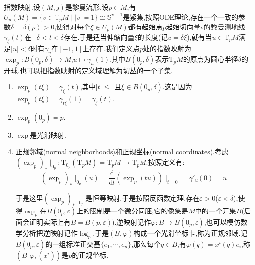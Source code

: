 指数映射.设$(M,g)$是黎曼流形,设$p\in M$,有$U_p(M)=\{v\in\mathrm{T}_pM\mid |v|=1\}\cong\mathbb{S}^{n-1}$是紧集,按照ODE理论,存在一个一致的参数$\delta=\delta(p)>0$,使得对每个$\xi\in U_p(M)$都有起始点$p$起始切向量$v$的黎曼测地线$\gamma_{\xi}(t)$在$-\delta<t<\delta$存在.于是适当伸缩向量$\xi$的长度(记$u=\delta\xi$),就有当$u\in\mathrm{T}_pM$满足$|u|<\delta$时有$\gamma_u$在$[-1,1]$上存在.我们定义点$p$处的指数映射为$\exp_p:B(0_p,\delta)\to M$,$u\mapsto\gamma_u(1)$,其中$B(0_p,\delta)$表示$\mathrm{T}_pM$的原点为圆心半径$\delta$的开球.也可以把指数映射的定义域理解为切丛的一个子集.
\begin{enumerate}
	\item $\exp_p(t\xi)=\gamma_{\xi}(t)$,其中$|t|\le1$且$\xi\in B(0_p,\delta)$.这是因为$\exp_p(t\xi)=\gamma_{t\xi}(1)=\gamma_{\xi}(t)$.
	\item $\exp_p(0_p)=p$. 
    \item $\exp$是光滑映射.
    \item 正规邻域(normal neighborhoods)和正规坐标(normal coordinates).考虑$(\exp_p)_*\mid_{0_p}:\mathrm{T}_{0_p}(\mathrm{T}_pM)=\mathrm{T}_pM\to\mathrm{T}_pM$.按照定义有:
    $$(\exp_p)_*\mid_{0_p}(u)=\frac{\mathrm{d}}{\mathrm{d}t}(\exp_p(tu))\mid_{t=0}=\gamma'_u(0)=u$$
    
    于是这里$(\exp_p)_*\mid_{0_p}$是恒等映射.于是按照反函数定理,存在$\varepsilon>0$($\varepsilon<\delta$),使得$\exp_p$在$B(0_p,\varepsilon)$上的限制是一个微分同胚,它的像集是$M$中的一个开集$B$(后面会证明实际上有$B=B(p,\varepsilon)$).逆映射记作$\varphi:B\to B(0_p,\varepsilon)$,也可以模仿数学分析把逆映射记作$\log_p$.于是$(B,\varphi)$构成一个光滑坐标卡,称为正规邻域.记$B(0_p,\varepsilon)$的一组标准正交基$\{e_1,\cdots,e_n\}$,那么每个$q\in B$,有$\varphi(q)=x^i(q)e_i$,称$(B,\varphi,(x^i))$是$p$的正规坐标.
\end{enumerate}


